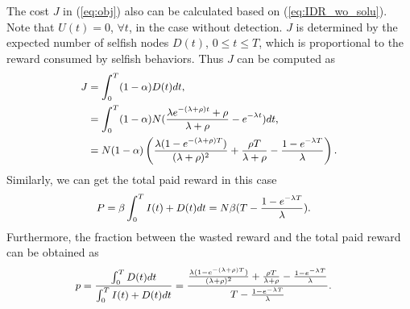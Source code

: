 The cost $J$ in (\ref{eq:obj}) also can be
calculated based on (\ref{eq:IDR_wo_solu}).
Note that $U(t)=0$, $\forall t$,
in the case without detection.
$J$ is determined by the expected number of selfish nodes $D(t)$,
$0 \le t \le T$,
which is proportional to the reward consumed by selfish behaviors.
Thus $J$ can be computed as
\begin{equation}
\begin{small}
\label{eq:IDR_wo_J}
\begin{aligned}
J &= \int_{0}^{T} (1-\alpha) D(t) dt, \\
&= \int_{0}^{T} (1-\alpha) N (\frac{\lambda e^{-(\lambda + \rho)t}
+ \rho}{ \lambda + \rho } - e^{- \lambda t}) dt, \\
&= N (1-\alpha) \left( \frac{\lambda (1-e^{-(\lambda+\rho)T})}
{ (\lambda + \rho)^{2} }
+ \frac{\rho T}{\lambda + \rho}
- \frac{1-e^{-\lambda T}}{\lambda} \right).
\end{aligned}
\end{small}
\end{equation}
Similarly, we can get the total paid reward in this case
\begin{equation}
\begin{small}
\nonumber
\begin{aligned}
P &= \beta \int_{0}^{T} I(t) + D(t) dt
= N \beta (T - \frac{ 1 - e^{-\lambda T} }{\lambda} ).
\end{aligned}
\end{small}
\end{equation}
Furthermore, the fraction between the wasted reward and the total paid reward can be obtained as
\begin{equation}
\begin{small}
\nonumber
\begin{aligned}
p = \frac{\int_{0}^{T} D(t) dt}{\int_{0}^{T} I(t) + D(t) dt}
&= \frac{ \frac{\lambda (1-e^{-(\lambda+\rho)T})}
{ (\lambda + \rho)^{2} }
+ \frac{\rho T}{\lambda + \rho}
- \frac{1-e^{-\lambda T}}{\lambda} }
{T - \frac{ 1 - e^{-\lambda T} }{\lambda} }.
\end{aligned}
\end{small}
\end{equation}

